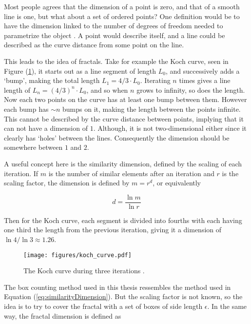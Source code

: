 Most people agrees that the dimension of a point is zero, and that of a smooth line is one, but what about a set of ordered points? One definition would be to have the dimension linked to the number of degrees of freedom needed to parametrize the object \cite{strogatz:dynamics_chaos}. A point would describe itself, and a line could be described as the curve distance from some point on the line.

This leads to the idea of fractals. Take for example the Koch curve, seen in Figure (\ref{fig:koch_curve}), it starts out as a line segment of length $L_0$, and successively adds a `bump', making the total length $L_1 = 4/3 \cdot L_0$. Iterating $n$ times gives a line length of $L_n = {(4 / 3)}^n \cdot L_0$, and so when $n$ grows to infinity, so does the length. Now each two points on the curve has at least one bump between them. However each bump has $\sim n$ bumps on it, making the length between the points infinite. This cannot be described by the curve distance between points, implying that it can not have a dimension of $1$. Although, it is not two-dimensional either since it clearly has `holes' between the lines. Consequently the dimension should be somewhere between $1$ and $2$.

A useful concept here is the similarity dimension, defined by the scaling of each iteration. If $m$ is the number of similar elements after an iteration and $r$ is the scaling factor, the dimension is defined by $m = r^d$, or equivalently

\begin{equation}
	d = \frac{\ln m}{\ln r}
\label{eq:similarityDimension}
\end{equation}

Then for the Koch curve, each segment is divided into fourths with each having one third the length from the previous iteration, giving it a dimension of $\ln 4 / \ln 3 \approx 1.26$.

\begin{figure}[h!]
    \centering
        \texttt{[image: figures/koch\_curve.pdf]}
    \caption{The Koch curve during three iterations \cite{strogatz:dynamics_chaos}.}
    \label{fig:koch_curve}
\end{figure}

The box counting method used in this thesis ressembles the method used in Equation (\ref{eq:similarityDimension}). But the scaling factor is not known, so the idea is to try to cover the fractal with a set of boxes of side length $\epsilon$. In the same way, the fractal dimension is defined as 

